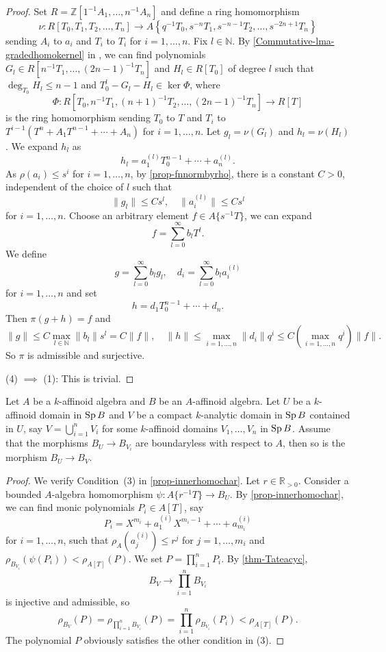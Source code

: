 \begin{proof}
    Set $R=\mathbb{Z}[1^{-1}A_1,\ldots,n^{-1}A_n]$ and define a ring homomorphism
    \[
        \nu:R[T_0,T_1,T_2,\ldots,T_n]\rightarrow A\left\{q^{-1}T_0,s^{-n}T_1,s^{-n-1}T_2,\ldots, s^{-2n+1}T_n \right\} 
    \]
    sending $A_i$ to $a_i$ and $T_i$ to $T_i$ for $i=1,\ldots,n$.  Fix $l\in \mathbb{N}$.
    By \cref{Commutative-lma-gradedhomokernel} in , we can find polynomials $G_l\in R[n^{-1}T_1,\ldots,(2n-1)^{-1}T_n]$ and $H_l\in R[T_0]$ of degree $l$ such that $\deg_{T_0}H_l\leq n-1$ and $T_0^l-G_l-H_l\in \ker \Phi$, where 
    \[
        \Phi:R[T_0,n^{-1}T_1,(n+1)^{-1}T_2,\ldots,(2n-1)^{-1}T_n]\rightarrow R[T]  
    \]
    is the ring homomorphism sending $T_0$ to $T$ and $T_i$ to $T^{i-1}(T^n+A_1 T^{n-1}+\cdots+A_n)$ for $i=1,\ldots,n$. Let $g_l=\nu(G_l)$ and $h_l=\nu(H_l)$. We expand $h_l$ as
    \[
        h_l=a_1^{(l)}T_0^{n-1}+\cdots+a_n^{(l)}.  
    \]
    As $\rho(a_i)\leq s^i$ for $i=1,\ldots,n$, by \cref{prop-fnnormbyrho}, there is a constant $C>0$, independent of the choice of $l$ such that
    \[
        \|g_l\|\leq Cs^l ,\quad \|a_i^{(l)}\|\leq Cs^l
    \]
    for $i=1,\ldots,n$. Choose an arbitrary element $f\in A\{s^{-1}T\}$, we can expand
    \[
        f=\sum_{l=0}^{\infty}b_l T^l.  
    \]
    We define
    \[
        g=  \sum_{l=0}^{\infty}b_lg_l,\quad d_i=\sum_{l=0}^{\infty}b_l a_i^{(l)}
    \]
    for $i=1,\ldots,n$ and set
    \[
        h=d_1T_0^{n-1}+\cdots+d_n.  
    \]
    Then $\pi(g+h)=f$ and 
    \[
        \|g\| \leq C\max_{l\in \mathbb{N}}\|b_l\|s^l=C\|f\|,\quad \|h\|\leq \max_{i=1,\ldots,n}\|d_i\|q^i\leq C\left(\max_{i=1,\ldots,n} q^i  \right)\|f\|.
    \]
    So $\pi$ is admissible and surjective.
    
    (4) $\implies$ (1): This is trivial.
\end{proof}


\begin{corollary}\label{cor-innerlocalontarget}
    Let $A$ be a $k$-affinoid algebra and $B$ be an $A$-affinoid algebra. Let $U$ be a $k$-affinoid domain in $\operatorname{Sp} B$ and $V$ be a compact $k$-analytic domain in $\operatorname{Sp} B$ contained in $U$, say $V=\bigcup_{i=1}^n V_i$ for some $k$-affinoid domains $V_1,\ldots,V_n$ in $\operatorname{Sp} B$. Assume that the morphisms $B_U\rightarrow B_{V_i}$ are boundaryless with respect to $A$, then so is the morphism $B_U\rightarrow B_V$.
\end{corollary}
\begin{proof}
    We verify Condition~(3) in \cref{prop-innerhomochar}. Let $r\in \mathbb{R}_{>0}$. Consider a bounded $A$-algebra homomorphism $\psi:A\{r^{-1}T\}\rightarrow B_U$. By \cref{prop-innerhomochar}, we can find monic polynomials $P_i\in A[T]$, say
    \[
        P_i=X^{m_i}+a^{(i)}_1X^{m_i-1}+\cdots+ a^{(i)}_{m_i}  
    \]
    for $i=1,\ldots,n$, such that $\rho_A(a^{(i)}_j)\leq r^j$ for $j=1,\ldots,m_i$ and $\rho_{B_{V_i}}(\psi(P_i))<\rho_{A[T]}(P)$. We set $P=\prod_{i=1}^n P_i$.
    By \cref{thm-Tateacyc}, 
    \[
        B_V\rightarrow \prod_{i=1}^n B_{V_i}
    \] 
    is injective and admissible, so 
    \[
        \rho_{B_V}(P)=\rho_{\prod_{i=1}^n B_{V_i}}(P)=\prod_{i=1}^n \rho_{B_{V_i}}(P_i)<\rho_{A[T]}(P).
    \]
    The polynomial $P$ obviously satisfies the other condition in (3).
\end{proof}


